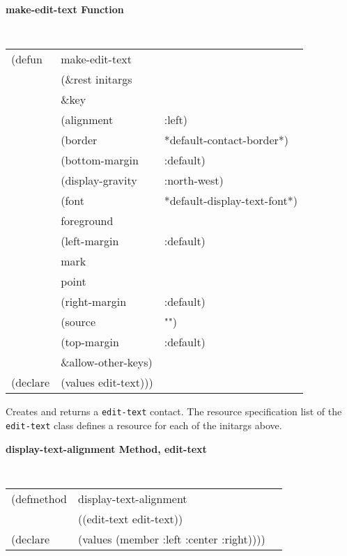 {\samepage
{\large {\bf make-edit-text \hfill Function}} 
\begin{flushright} \parbox[t]{6.125in}{
\tt
\begin{tabular}{lll}
\raggedright
(defun & make-edit-text \\
       & (\&rest initargs \\
       & \&key  \\
       & (alignment           & :left)\\
       & (border              & *default-contact-border*) \\ 
       & (bottom-margin       & :default) \\ 
       & (display-gravity             & :north-west) \\
       & (font                & *default-display-text-font*) \\ 
       & foreground \\
       & (left-margin         & :default) \\ 
       & mark                &  \\ 
       & point               &\\ 
       & (right-margin        & :default) \\ 
       & (source              & "")\\ 
       & (top-margin          & :default) \\
       &   \&allow-other-keys) \\
(declare & (values   edit-text)))
\end{tabular}
\rm

}\end{flushright}}

\begin{flushright} \parbox[t]{6.125in}{
Creates and returns a {\tt edit-text} contact.
The resource specification list of the {\tt edit-text} class defines
a resource for each of the initargs above.

}\end{flushright}




{\samepage  
{\large {\bf display-text-alignment \hfill Method, edit-text}}
\begin{flushright} \parbox[t]{6.125in}{
\tt
\begin{tabular}{lll}
\raggedright
(defmethod & display-text-alignment & \\
& ((edit-text  edit-text)) \\
(declare & (values (member :left :center :right))))
\end{tabular}
\rm

}\end{flushright}}

